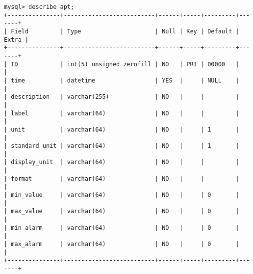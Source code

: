 \documentclass[11pt,a4paper]{article}
\begin{document}
{\footnotesize
	\begin{Verbatim}
mysql> describe apt;
+---------------+--------------------------+------+-----+---------+-------+
| Field         | Type                     | Null | Key | Default | Extra |
+---------------+--------------------------+------+-----+---------+-------+
| ID            | int(5) unsigned zerofill | NO   | PRI | 00000   |       |
| time          | datetime                 | YES  |     | NULL    |       |
| description   | varchar(255)             | NO   |     |         |       |
| label         | varchar(64)              | NO   |     |         |       |
| unit          | varchar(64)              | NO   |     | 1       |       |
| standard_unit | varchar(64)              | NO   |     | 1       |       |
| display_unit  | varchar(64)              | NO   |     |         |       |
| format        | varchar(64)              | NO   |     |         |       |
| min_value     | varchar(64)              | NO   |     | 0       |       |
| max_value     | varchar(64)              | NO   |     | 0       |       |
| min_alarm     | varchar(64)              | NO   |     | 0       |       |
| max_alarm     | varchar(64)              | NO   |     | 0       |       |
+---------------+--------------------------+------+-----+---------+-------+
	\end{Verbatim}
}

\newpage{\clearpage}
\end{document}

